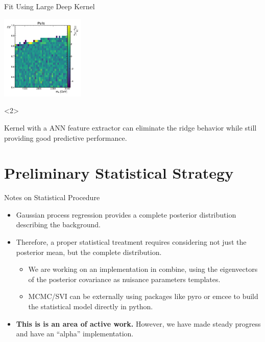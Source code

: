 \documentclass[10pt]{beamer}
\begin{document}
\begin{frame}{Fit Using Large Deep Kernel}
\begin{center}
    \includegraphics[width=0.3\textwidth]{figures/2dpullplots/nnrbf_256_128_16/E_2000_0p5_150_0p07.pdf} 
  \end{center}
  \begin{onlyenv}<2>
    \begin{beamerpopover}
      \begin{block}{}
        Kernel with a ANN feature extractor can eliminate the ridge behavior while still providing good predictive performance.
      \end{block}
    \end{beamerpopover}
  \end{onlyenv}
\end{frame}


\section[Statistical Considerations]{Preliminary Statistical Strategy}

\begin{frame}{Notes on Statistical Procedure}
  \begin{itemize}
  \item Gaussian process regression provides a complete posterior distribution describing the background. 
  \item Therefore, a proper statistical treatment requires considering not just the posterior mean, but the complete distribution.
    \begin{itemize}
    \item We are working on an implementation in combine, using the eigenvectors of the posterior covariance as nuisance parameters templates. 
    \item MCMC/SVI can be externally using packages like pyro or emcee to build the statistical model directly in python.
    \end{itemize}
  \item {\bfseries This is is an area of active work. } However, we have made steady progress and have an ``alpha'' implementation.
  \end{itemize}


\end{frame}
\end{document}
